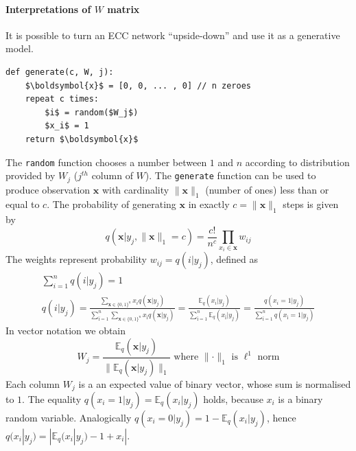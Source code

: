 \documentclass[12pt]{article}
\begin{document}
\paragraph{Interpretations of $W$ matrix}  It is possible to turn an ECC network ``upside-down'' and use it as a generative model.
\begin{lstlisting}
def generate(c, W, j):
    $\boldsymbol{x}$ = [0, 0, ... , 0] // n zeroes
    repeat c times:
        $i$ = random($W_j$)
        $x_i$ = 1
    return $\boldsymbol{x}$
\end{lstlisting}
The \texttt{random} function chooses a number between $1$ and $n$ according to distribution provided by $W_j$ ($j^{th}$ column of $W$). The \texttt{generate} function can be used to produce observation $\boldsymbol{x}$ with cardinality $\lVert\boldsymbol{x} \rVert_1$ (number of ones) less than or equal to $c$.  The probability of generating $\boldsymbol{x}$ in exactly $c=\lVert\boldsymbol{x} \rVert_1$ steps is given by 
 \[
 q(\boldsymbol{x}|y_j, \lVert\boldsymbol{x} \rVert_1 = c) = \frac{c!}{n^c}\prod_{x_i\in\boldsymbol{x}} w_{ij}
 \]
 The weights represent probability $w_{ij} = q(i| y_j)$, defined as
\begin{gather*}
\sum_{i=1}^{n} q(i | y_j) = 1 \\
q(i | y_j) =
\frac{\sum_{\boldsymbol{x}\in\{0,1\}^n}x_i  q(\boldsymbol{x}|y_j) }{\sum_{ï=1}^{n} \sum_{\boldsymbol{x}\in\{0,1\}^n}    x_{ï}  q(\boldsymbol{x}|y_j) } = \frac{\mathbb{E}_q(x_i|y_j)}{\sum_{ï=1}^{n} \mathbb{E}_q(x_{ï}|y_j)} =  \frac{q(x_i{=}1|y_j)}{\sum_{ï=1}^{n} q(x_{ï}{=}1|y_j)} 
\end{gather*}
In vector notation we obtain
\[
W_j = \frac{\mathbb{E}_q(\boldsymbol{x}|y_j)}{\lVert \mathbb{E}_q(\boldsymbol{x}|y_j) \rVert _1}\text{ where }\lVert \cdot \rVert _1\text{ is }\ell^1\text{ norm}
\]
Each column $W_j$ is a an expected value of binary vector, whose sum is normalised to $1$. The equality  $q(x_i{=}1|y_j)=\mathbb{E}_q(x_i|y_j)$ holds, because $x_i$ is a binary random variable. Analogically $q(x_i{=}0|y_j)=1-\mathbb{E}_q(x_i|y_j)$, hence $q(x_i|y_j)=|\mathbb{E}_q(x_i|y_j)-1+x_i|$.
\end{document}
